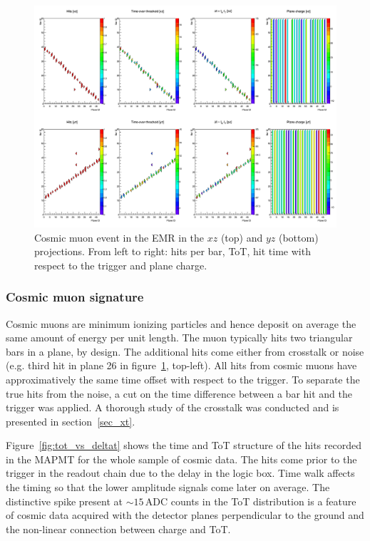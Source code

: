 \documentclass[a4paper,11pt]{article}
\begin{document}
\begin{figure}[!htr]
\centering
\includegraphics[width=\textwidth]{cosmic_event.png}
\caption{Cosmic muon event in the EMR in the $xz$ (top) and $yz$ (bottom) projections. From left to right: hits per bar, ToT, hit time
with respect to the trigger and plane charge.}
\label{fig:cosmic_muon}
\end{figure}

\subsubsection{Cosmic muon signature}\label{sec:cosmic_sig}
Cosmic muons are minimum ionizing particles and hence deposit on average the same amount of energy per unit length. The muon typically hits two triangular
bars in a plane, by design. The additional hits come either from crosstalk or noise (e.g. third hit in plane 26 in figure~\ref{fig:cosmic_muon},
top-left). All hits from cosmic muons have approximatively the same time offset with respect to the trigger. To separate the true hits from the noise, a cut on
the time difference between a bar hit and the trigger was applied. A thorough study of the crosstalk was conducted and is presented in section~\ref{sec_xt}.
 
Figure~\ref{fig:tot_vs_deltat} shows the time and ToT structure of the hits recorded in the MAPMT for the whole sample of cosmic data. The hits
come prior to the trigger in the readout chain due to the delay in the logic box. Time walk affects the timing so that the lower amplitude signals come
later on average. The distinctive spike present at $\sim15$\,ADC counts in the ToT distribution is a feature of cosmic data acquired with the detector planes perpendicular to the ground and the non-linear connection between charge and ToT.
\end{document}
